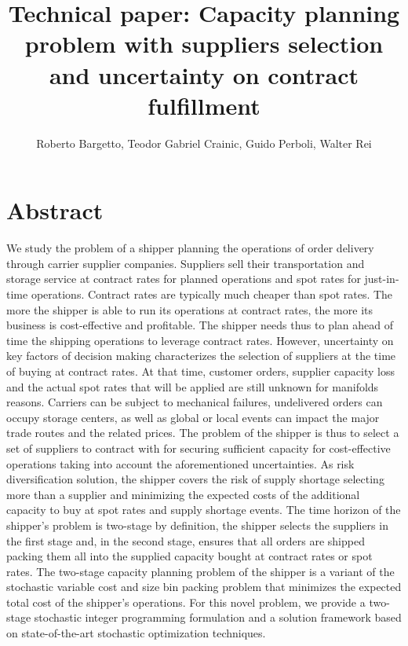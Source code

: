 \documentclass[a4paper,11pt]{article}
\title{ \huge \bfseries Technical paper: Capacity planning problem with suppliers selection and uncertainty on contract fulfillment }
\author
{
	Roberto Bargetto,
	Teodor Gabriel Crainic,
	Guido Perboli,
	Walter Rei
	
}
\date{}
\begin{document}
	\maketitle	
	\tableofcontents
	
	\section*{Abstract}
	We study the problem of a shipper planning the operations of order delivery through carrier supplier companies.
	Suppliers sell their transportation and storage service at contract rates for planned operations and spot rates for just-in-time operations.
	Contract rates are typically much cheaper than spot rates.
	The more the shipper is able to run its operations at contract rates, the more its business is cost-effective and profitable.
	The shipper needs thus to plan ahead of time the shipping operations to leverage contract rates.
	However, uncertainty on key factors of decision making characterizes the selection of suppliers at the time of buying at contract rates.
	At that time, customer orders, supplier capacity loss and the actual spot rates that will be applied are still unknown for manifolds reasons.
	Carriers can be subject to mechanical failures, undelivered orders can occupy storage centers, as well as global or local events can impact the major trade routes and the related prices.
	The problem of the shipper is thus to select a set of suppliers to contract with for securing sufficient capacity for cost-effective operations taking into account the aforementioned uncertainties.
	As risk diversification solution, the shipper covers the risk of supply shortage selecting more than a supplier and minimizing the expected costs of the additional capacity to buy at spot rates and supply shortage events.
	The time horizon of the shipper's problem is two-stage by definition, the shipper selects the suppliers in the first stage and, in the second stage, ensures that all orders are shipped packing them all into the supplied capacity bought at contract rates or spot rates.
	The two-stage capacity planning problem of the shipper is a variant of the stochastic variable cost and size bin packing problem that minimizes the expected total cost of the shipper's operations.
	For this novel problem, we provide a two-stage stochastic integer programming formulation and a solution framework based on state-of-the-art stochastic optimization techniques.
\end{document}
